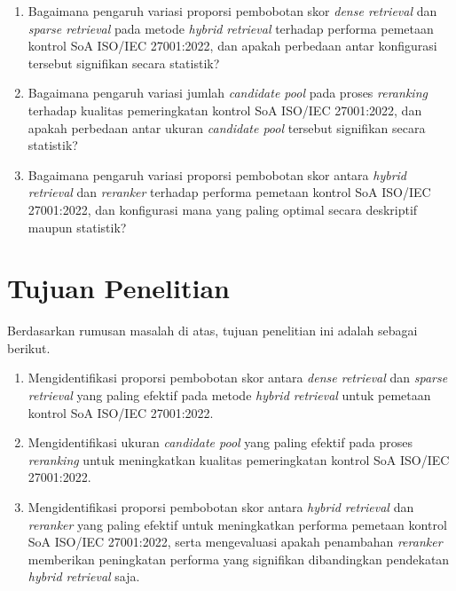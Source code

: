 \begin{enumerate}
	\item Bagaimana pengaruh variasi proporsi pembobotan skor \textit{dense retrieval} dan \textit{sparse retrieval} pada metode \textit{hybrid retrieval} terhadap performa pemetaan kontrol SoA ISO/IEC 27001:2022, dan apakah perbedaan antar konfigurasi tersebut signifikan secara statistik?
	\item Bagaimana pengaruh variasi jumlah \textit{candidate pool} pada proses \textit{reranking} terhadap kualitas pemeringkatan kontrol SoA ISO/IEC 27001:2022, dan apakah perbedaan antar ukuran \textit{candidate pool} tersebut signifikan secara statistik?
	\item Bagaimana pengaruh variasi proporsi pembobotan skor antara \textit{hybrid retrieval} dan \textit{reranker} terhadap performa pemetaan kontrol SoA ISO/IEC 27001:2022, dan konfigurasi mana yang paling optimal secara deskriptif maupun statistik?
\end{enumerate}
\section{Tujuan Penelitian}
Berdasarkan rumusan masalah di atas, tujuan penelitian ini adalah sebagai berikut.

\begin{enumerate}
	\item Mengidentifikasi proporsi pembobotan skor antara \textit{dense retrieval} dan \textit{sparse retrieval} yang paling efektif pada metode \textit{hybrid retrieval} untuk pemetaan kontrol SoA ISO/IEC 27001:2022.
	\item Mengidentifikasi ukuran \textit{candidate pool} yang paling efektif pada proses \textit{reranking} untuk meningkatkan kualitas pemeringkatan kontrol SoA ISO/IEC 27001:2022.
	\item Mengidentifikasi proporsi pembobotan skor antara \textit{hybrid retrieval} dan \textit{reranker} yang paling efektif untuk meningkatkan performa pemetaan kontrol SoA ISO/IEC 27001:2022, serta mengevaluasi apakah penambahan \textit{reranker} memberikan peningkatan performa yang signifikan dibandingkan pendekatan \textit{hybrid retrieval} saja.
\end{enumerate}
